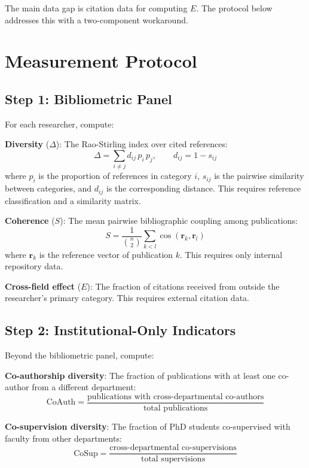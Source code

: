 \documentclass[
]{article}
\begin{document}
The main data gap is citation data for computing \(E\). The protocol
below addresses this with a two-component workaround.

\hypertarget{measurement-protocol}{%
\section{Measurement Protocol}\label{measurement-protocol}}

\hypertarget{step-1-bibliometric-panel}{%
\subsection{Step 1: Bibliometric
Panel}\label{step-1-bibliometric-panel}}

For each researcher, compute:

\textbf{Diversity} (\(\Delta\)): The Rao-Stirling index over cited
references:
\[\Delta = \sum_{i \neq j} d_{ij}\, p_i\, p_j, \qquad d_{ij} = 1 - s_{ij}\]
where \(p_i\) is the proportion of references in category \(i\),
\(s_{ij}\) is the pairwise similarity between categories, and \(d_{ij}\)
is the corresponding distance. This requires reference classification
and a similarity matrix.

\textbf{Coherence} (\(S\)): The mean pairwise bibliographic coupling
among publications:
\[S = \frac{1}{\binom{n}{2}} \sum_{k < l} \cos(\mathbf{r}_k, \mathbf{r}_l)\]
where \(\mathbf{r}_k\) is the reference vector of publication \(k\).
This requires only internal repository data.

\textbf{Cross-field effect} (\(E\)): The fraction of citations received
from outside the researcher's primary category. This requires external
citation data.

\hypertarget{step-2-institutional-only-indicators}{%
\subsection{Step 2: Institutional-Only
Indicators}\label{step-2-institutional-only-indicators}}

Beyond the bibliometric panel, compute:

\textbf{Co-authorship diversity}: The fraction of publications with at
least one co-author from a different department:
\[\text{CoAuth} = \frac{\text{publications with cross-departmental co-authors}}{\text{total publications}}\]

\textbf{Co-supervision diversity}: The fraction of PhD students
co-supervised with faculty from other departments:
\[\text{CoSup} = \frac{\text{cross-departmental co-supervisions}}{\text{total supervisions}}\]
\end{document}
